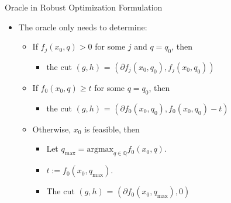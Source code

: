 \documentclass[10pt,ignorenonframetext,serif,onlymath]{beamer}
\providecommand{\tightlist}{%
  \setlength{\itemsep}{0pt}\setlength{\parskip}{0pt}}
\begin{document}
\begin{frame}{Oracle in Robust Optimization Formulation}
\protect\hypertarget{sec:oracle-in-robust-optimization-formulation}{}

\begin{itemize}
\tightlist
\item
  The oracle only needs to determine:

  \begin{itemize}
  \tightlist
  \item
    If \(f_j(x_0, q) > 0\) for some \(j\) and \(q = q_0\), then

    \begin{itemize}
    \tightlist
    \item
      the cut \((g, h)\) = \((\partial f_j(x_0, q_0), f_j(x_0, q_0))\)
    \end{itemize}
  \item
    If \(f_0(x_0, q) \geq t\) for some \(q = q_0\), then

    \begin{itemize}
    \tightlist
    \item
      the cut \((g, h)\) =
      \((\partial f_0(x_0, q_0), f_0(x_0, q_0) - t)\)
    \end{itemize}
  \item
    Otherwise, \(x_0\) is feasible, then

    \begin{itemize}
    \tightlist
    \item
      Let \(q_{\max} = \text{argmax}_{q \in {\mathbb{Q}}} f_0(x_0, q)\).
    \item
      \(t := f_0(x_0, q_{\max})\).
    \item
      The cut \((g, h)\) = \((\partial f_0(x_0, q_{\max}), 0)\)
    \end{itemize}
  \end{itemize}
\end{itemize}

\end{frame}
\end{document}
